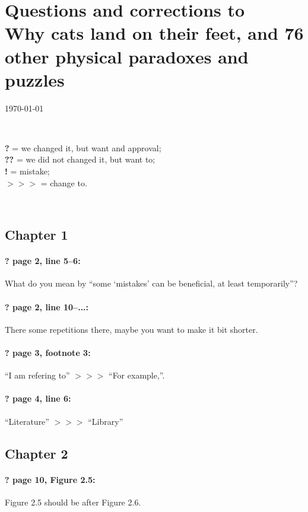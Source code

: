 \documentclass[twoside]{article}
\begin{document}
\pagestyle{empty}

\section*{Questions and corrections to\\
Why cats land on their feet, and 76 other physical paradoxes
and puzzles}

\today

\

\noindent
\textbf{?} = we changed it, but want and approval;\\
\textbf{??} = we did not changed it, but want to;\\
\textbf{!} = mistake;\\
$>\!>\!>$ = change to.

\

\subsection*{Chapter 1}

\paragraph{? page 2, line 5--6:} What do you mean by ``some ‘mistakes’ can be beneficial, at least temporarily''?

\paragraph{? page 2, line 10--...:} There some repetitions there, maybe you want to make it bit shorter.

\paragraph{? page 3, footnote 3:} ``I am refering to'' $>\!>\!>$ ``For example,''.

\paragraph{? page 4, line 6:} ``Literature'' $>\!>\!>$ ``Library''

\subsection*{Chapter 2}

\paragraph{? page 10, Figure 2.5:} Figure  2.5 should be after Figure 2.6.
\end{document}
